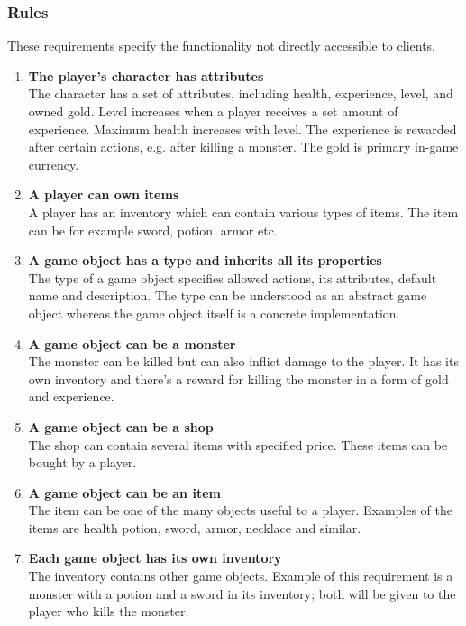 		\subsubsection*{Rules}
		These requirements specify the functionality not directly accessible to clients.
		\begin{enumerate}						
			\item \textbf{The player's character has attributes} \\
			The character has a set of attributes, including health, experience, level, and owned gold. Level increases when a player receives a set amount of experience. Maximum health increases with level. The experience is rewarded after certain actions, e.g. after killing a monster. The gold is primary in-game currency.
			  
			\item \textbf{A player can own items} \\
			A player has an inventory which can contain various types of items. The item can be for example sword, potion, armor etc. 
			
			\item \textbf{A game object has a type and inherits all its properties} \\
			The type of a game object specifies allowed actions, its attributes, default name and description. The type can be understood as an abstract game object whereas the game object itself is a concrete implementation.	
			
			\item \textbf{A game object can be a monster} \\
			The monster can be killed but can also inflict damage to the player. It has its own inventory and there's a reward for killing the monster in a form of gold and experience.
			
			\item \textbf{A game object can be a shop} \\
			The shop can contain several items with specified price. These items can be bought by a player. 
			
			\item \textbf{A game object can be an item} \\	
			The item can be one of the many objects useful to a player. Examples of the items are health potion, sword, armor, necklace and similar.
			
			\item \textbf{Each game object has its own inventory} \\
			The inventory contains other game objects. Example of this requirement is a monster with a potion and a sword in its inventory; both will be given to the player who kills the monster.  
			

\end{enumerate}
